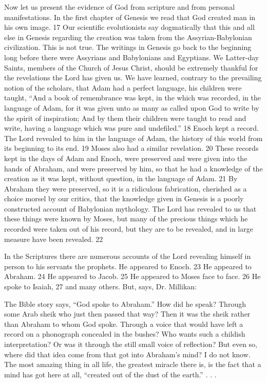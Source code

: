 Now let us present the evidence of God from scripture and from personal manifestations. In
the first chapter of Genesis we read that God created man in his own image. 17 Our scientific
evolutionists say dogmatically that this and all else in Genesis regarding the creation was
taken from the Assyrian-Babylonian civilization. This is not true. The writings in Genesis go
back to the beginning long before there were Assyrians and Babylonians and Egyptians. We
Latter-day Saints, members of the Church of Jesus Christ, should be extremely thankful for
the revelations the Lord has given us. We have learned, contrary to the prevailing notion of
the scholars, that Adam had a perfect language, his children were taught, ``And a book of
remembrance was kept, in the which was recorded, in the language of Adam, for it was given
unto as many as called upon God to write by the spirit of inspiration; And by them their
children were taught to read and write, having a language which was pure and undefiled.'' 18
Enoch kept a record. The Lord revealed to him in the language of Adam, the history of this
world from its beginning to its end. 19 Moses also had a similar revelation. 20 These records
kept in the days of Adam and Enoch, were preserved and were given into the hands of
Abraham, and were preserved by him, so that he had a knowledge of the creation as it was
kept, without question, in the language of Adam. 21 By Abraham they were preserved, so it
is a ridiculous fabrication, cherished as a choice morsel by our critics, that the knowledge
given in Genesis is a poorly constructed account of Babylonian mythology. The Lord has
revealed to us that these things were known by Moses, but many of the precious things which
he recorded were taken out of his record, but they are to be revealed, and in large measure
have been revealed. 22

In the Scriptures there are numerous accounts of the Lord revealing himself in person to his
servants the prophets. He appeared to Enoch. 23 He appeared to Abraham. 24 He appeared to
Jacob. 25 He appeared to Moses face to face. 26 He spoke to Isaiah, 27 and many others.
But, says, Dr. Millikan:

The Bible story says, ``God spoke to Abraham.'' How did he speak? Through some Arab
sheik who just then passed that way? Then it was the sheik rather than Abraham to whom
God spoke. Through a voice that would have left a record on a phonograph concealed in the
bushes? Who wants such a childish interpretation? Or was it through the still small voice of
reflection? But even so, where did that idea come from that got into Abraham's mind? I do
not know. The most amazing thing in all life, the greatest miracle there is, is the fact that a
mind has got here at all, ``created out of the dust of the earth.'' . . .

